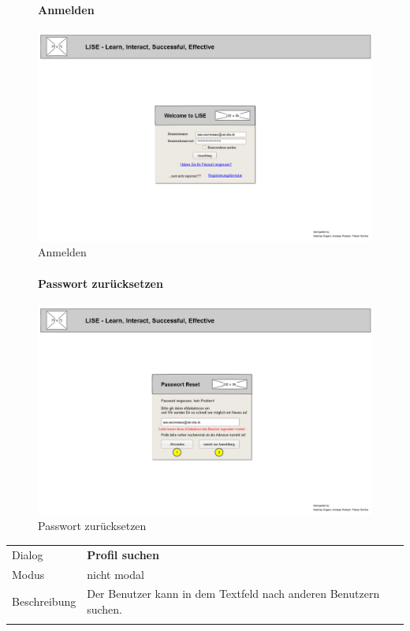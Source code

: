 \documentclass[12pt,a4paper]{article}
\begin{document}
{\begin{figure}[H]
	\paragraph{Anmelden}
	\includegraphics[width=\textwidth]{Bilder/Mockups/GUI/Anmeldung.png}
	\caption{Anmelden}
	\label{GuiAnmelden}
\end{figure}

\begin{figure}[H]
	\centering
	\paragraph{Passwort zurücksetzen}
	\includegraphics[width=\textwidth]{Bilder/Mockups/GUI/PasswortVergessen.png}
	\caption{Passwort zurücksetzen}
	\label{GuiPasswortVergessen}
\end{figure}


\begin{tabular}{l p{12cm}}
Dialog 	 & \textbf{Profil suchen} \\ 
Modus & nicht modal\\ 
Beschreibung   	 & Der Benutzer kann in dem Textfeld nach anderen Benutzern suchen.\\\\


\end{tabular}}
\end{document}
